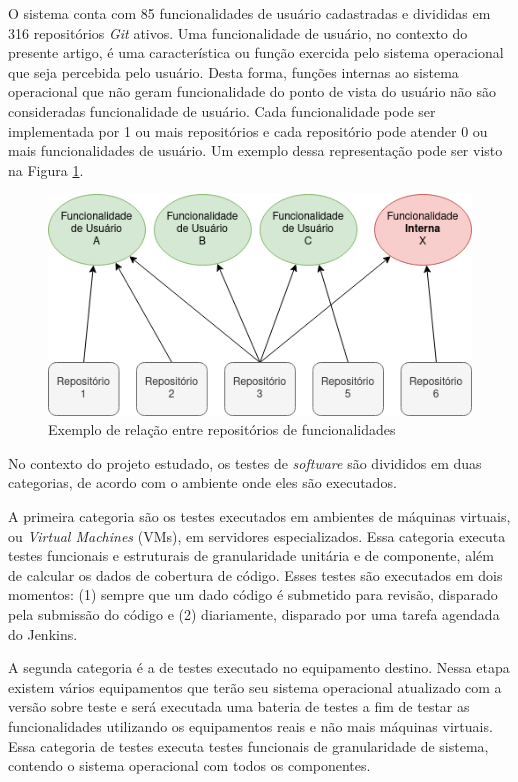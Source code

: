 \documentclass[11.5pt]{article}
\begin{document}
O sistema conta com 85 funcionalidades de usuário cadastradas e divididas em 316 repositórios
\textit{Git} ativos.
Uma funcionalidade de usuário, no contexto do presente artigo, é uma característica ou função
exercida pelo sistema operacional que seja percebida pelo usuário.
Desta forma, funções internas ao sistema operacional que não geram funcionalidade do ponto de vista
do usuário não são consideradas funcionalidade de usuário.
Cada funcionalidade pode ser implementada por 1 ou mais repositórios e cada repositório pode atender
0 ou mais funcionalidades de usuário. Um exemplo dessa representação pode ser visto na Figura
\ref{fig:features_repos}.

\begin{figure}[ht]
    \centering
    \includegraphics[width=.7\textwidth]{features_repos.png}
    \caption{Exemplo de relação entre repositórios de funcionalidades}
    \label{fig:features_repos}
\end{figure}

No contexto do projeto estudado, os testes de \textit{software} são divididos em duas categorias, de
acordo com o ambiente onde eles são executados.

A primeira categoria são os testes executados em ambientes de máquinas virtuais, ou
\textit{Virtual Machines} (VMs), em servidores especializados.
Essa categoria executa testes funcionais e estruturais de granularidade unitária e de componente,
além de calcular os dados de cobertura de código.
Esses testes são executados em dois momentos:
(1) sempre que um dado código é submetido para revisão, disparado pela submissão do código e
(2) diariamente, disparado por uma tarefa agendada do Jenkins.

A segunda categoria é a de testes executado no equipamento destino.
Nessa etapa existem vários equipamentos que terão seu sistema operacional atualizado com a versão
sobre teste e será executada uma bateria de testes a fim de testar as funcionalidades utilizando
os equipamentos reais e não mais máquinas virtuais.
Essa categoria de testes executa testes funcionais de granularidade de sistema, contendo o sistema
operacional com todos os componentes.
\end{document}

